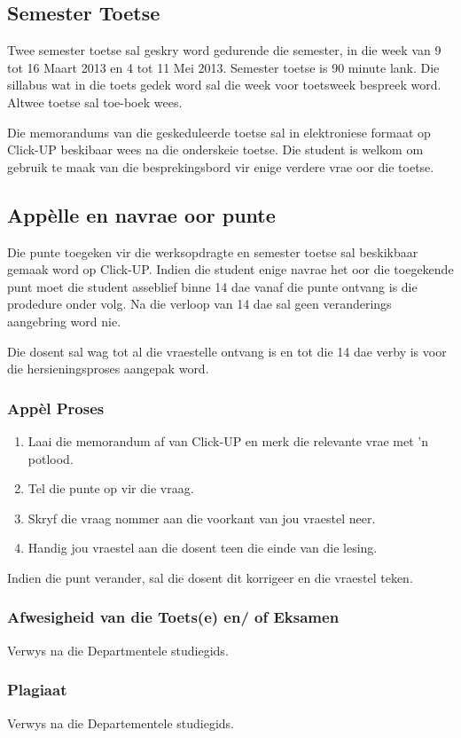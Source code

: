     \subsection{Semester Toetse}
	Twee semester toetse sal geskry word gedurende die semester, in die 
	week van 9 tot 16 Maart 2013 en 4 tot 11 Mei 2013. Semester toetse is 90 minute lank.
	Die sillabus wat in die toets gedek word
	sal die week voor toetsweek bespreek word.  Altwee toetse sal 
	toe-boek wees.
        
	Die memorandums van die geskeduleerde toetse sal in elektroniese formaat
	op Click-UP beskibaar wees na die onderskeie toetse. Die student is welkom om gebruik te maak van die 
	besprekingsbord vir enige verdere vrae oor die toetse.
	
    \subsection{App\`{e}lle en navrae oor punte}
	Die punte toegeken vir die werksopdragte en semester toetse sal 
	beskikbaar gemaak word op Click-UP. Indien die student enige navrae het oor die toegekende punt
	moet die student asseblief binne 14 dae vanaf 
	die punte ontvang is die prodedure onder volg. 
	Na die verloop van 14 dae sal geen veranderings 
	aangebring word nie.
	
	Die dosent sal wag tot al die vraestelle ontvang is en tot die 14 dae verby is voor die 
	hersieningsproses aangepak word. 

        \subsubsection{App\`{e}l Proses}
            \begin{enumerate}
                \item Laai die memorandum af van Click-UP en merk die relevante
                    vrae met 'n potlood.
                \item Tel die punte op vir die vraag.
                \item Skryf die vraag nommer aan die voorkant van jou vraestel 
                    neer.
                \item Handig jou vraestel aan die dosent teen die einde van die 
                    lesing.
            \end{enumerate}

            Indien die punt verander, sal die dosent dit korrigeer en die vraestel teken.
        
        \subsubsection{Afwesigheid van die Toets(e) en/ of Eksamen}
            Verwys na die Departmentele studiegids.
        
        \subsubsection{Plagiaat}
            Verwys na die Departementele studiegids.



